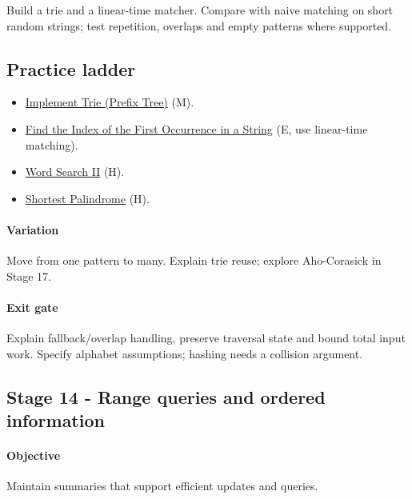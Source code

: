 \documentclass[11pt,letterpaper]{article}
\begin{document}
Build a trie and a linear-time matcher. Compare with naive matching on short random strings; test repetition, overlaps and empty patterns where supported.

\subsection*{Practice ladder}

\begin{itemize}

\item \href{https://leetcode.com/problems/implement-trie-prefix-tree/}{Implement Trie (Prefix Tree)} (M).

\item \href{https://leetcode.com/problems/find-the-index-of-the-first-occurrence-in-a-string/}{Find the Index of the First Occurrence in a String} (E, use linear-time matching).

\item \href{https://leetcode.com/problems/word-search-ii/}{Word Search II} (H).

\item \href{https://leetcode.com/problems/shortest-palindrome/}{Shortest Palindrome} (H).

\end{itemize}

\paragraph*{Variation}

Move from one pattern to many. Explain trie reuse; explore Aho-Corasick in Stage 17.

\paragraph*{Exit gate}

Explain fallback/overlap handling, preserve traversal state and bound total input work. Specify alphabet assumptions; hashing needs a collision argument.

\par{}
\begin{samepage}
\section{Stage 14 - Range queries and ordered information}\label{sec:18}

\label{stage:14}


\paragraph*{Objective}

Maintain summaries that support efficient updates and queries.

\end{samepage}
\end{document}
